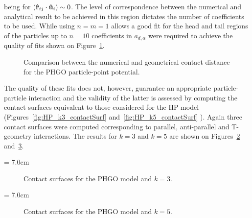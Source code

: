 being for $\left( \mathbf{\hat{r} }_{ij} \cdot \mathbf{\hat{u} }_i \right) \sim 0$. The level of correspondence between the numerical and
analytical result to be achieved in this region dictates the number of coefficients to be used.
While using $n=m=1$ allows a good fit for the head and tail regions of the particles
up to $n=10$ coefficients in $a_{d,\alpha}$ were required to achieve the quality of fits shown on
Figure~\ref{fig:GBP_2dFit}.
%
\picW=8.0cm
\begin{figure}
	\centering
	\caption{Comparison between the numerical and geometrical contact distance for the PHGO
	particle-point potential.}
	\label{fig:GBP_2dFit}
\end{figure}
%

The quality of these fits does not, however, guarantee an appropriate particle-particle
interaction and the validity of the latter is assessed by computing the contact surfaces
equivalent to those considered for
the HP model (\eg Figures~\ref{fig:HP_k3_contactSurf} and~\ref{fig:HP_k5_contactSurf} ). 
Again three contact surfaces were computed corresponding
to parallel, anti-parallel and T-geometry interactions. The results for $k=3$ and $k=5$ are
shown on Figures~\ref{fig:GBP_contactSurfaces_k3} and~\ref{fig:GBP_contactSurfaces_k5}.

\picW = 7.0cm
\begin{figure}
	\centering
	\caption{Contact surfaces for the PHGO model and $k=3$.}
	\label{fig:GBP_contactSurfaces_k3}
\end{figure}

\picW = 7.0cm
\begin{figure}
	\centering
	\caption{Contact surfaces for the PHGO model and $k=5$.}
	\label{fig:GBP_contactSurfaces_k5}
\end{figure}


